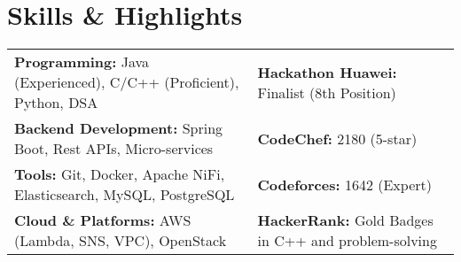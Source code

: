 \section{\Large Skills \& Highlights}
\vspace{-2pt}
\begin{tabularx}{\textwidth}{@{}X X@{}}
\textbf{Programming:} Java (Experienced), C/C++ (Proficient), Python, DSA  & \textbf{Hackathon Huawei:} Finalist (8th Position) \\
\textbf{Backend Development:} Spring Boot, Rest APIs, Micro-services  & \textbf{CodeChef:} 2180 (5-star) \\
\textbf{Tools:} Git, Docker, Apache NiFi, Elasticsearch, MySQL, PostgreSQL  & \textbf{Codeforces:} 1642 (Expert) \\
\textbf{Cloud \& Platforms:} AWS (Lambda, SNS, VPC), OpenStack  & \textbf{HackerRank:} Gold Badges in C++ and problem-solving \\
\end{tabularx}
